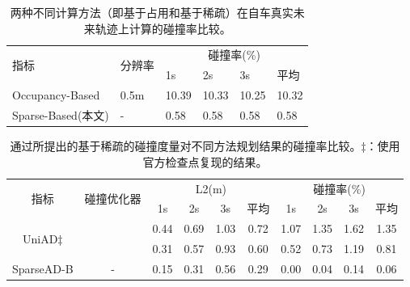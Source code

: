 \begin{table}[t]
		\caption{两种不同计算方法（即基于占用\cite{hu2022st}和基于稀疏）在自车真实未来轨迹上计算的碰撞率比较。}
		\begin{center}
			\tiny
			\vspace{-10pt}
			{
				\begin{tabular}{p{3cm}|p{1.5cm}<{\centering}|p{0.7cm}<{\centering}p{0.7cm}<{\centering}p{0.7cm}<{\centering}p{0.7cm}<{\centering}}
					\toprule
					\multirow{2}{*}{指标}& \multirow{2}{*}{分辨率}& \multicolumn{4}{c}{碰撞率(\%)} \\
					&& 1s& 2s& 3s& 平均\\
					\midrule
					Occupancy-Based\cite{hu2022st}&0.5m& 10.39	&10.33&	10.25& 10.32\\
					Sparse-Based(本文)&-&0.58&	0.58&	0.58& 0.58\\
					\bottomrule
				\end{tabular}%
			}
		\end{center}
		\label{tab:gt-collision}
	\end{table}

	\begin{table}[t]
		\caption{通过所提出的基于稀疏的碰撞度量对不同方法规划结果的碰撞率比较。$\ddag$：使用官方检查点复现的结果。}
		\begin{center}
			\tiny
			\vspace{-10pt}
			{
				\begin{tabular}{c|c|cccc|cccc}
					\toprule
					\multirow{2}{*}{指标}& \multirow{2}{*}{碰撞优化器}& \multicolumn{4}{c|}{L2(m)}& \multicolumn{4}{c}{碰撞率(\%)} \\
					&&1s& 2s& 3s& 平均& 1s& 2s& 3s& 平均\\
					\midrule
					\multirow{2}{*}{UniAD$\ddag$\cite{hu2023planning}}&\Checkmark&0.44&0.69&1.03 &0.72&1.07&	1.35&	1.62&1.35\\
					&\XSolidBrush&0.31&0.57&0.93&0.60&0.52&	0.73&	1.19&0.81\\
					\midrule
					{SparseAD-B}&-&0.15&0.31&0.56&0.29&	0.00& 0.04&	0.14&0.06\\
					\bottomrule
				\end{tabular}%
			}
		\end{center}
		\label{tab:pred-collision}
	\end{table}
